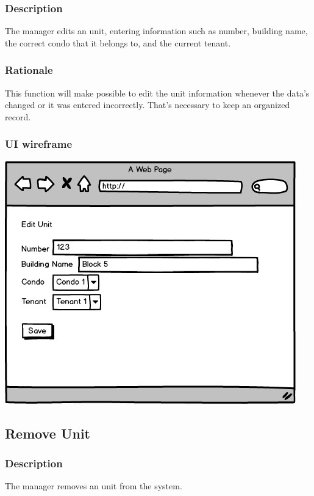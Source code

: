 \documentclass{scrreprt}
\begin{document}
\subsubsection{Description}

The manager edits an unit, entering information such as number, building name, the correct condo that it belongs to, and the current tenant.

\subsubsection{Rationale}

This function will make possible to edit the unit information whenever the data's changed or it was entered incorrectly. That's necessary to keep an organized record.

\subsubsection{UI wireframe}
\includegraphics[scale=0.60]{mockups/editunit.png}

\subsection{Remove Unit}
\subsubsection{Description}

The manager removes an unit from the system.
\end{document}
